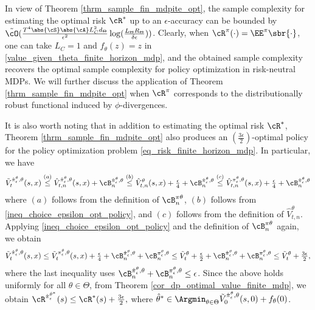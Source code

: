 \documentclass[9pt]{article}
\numberwithin{equation}{section}
\renewcommand{\frac}[2]{\tfrac{#1}{#2}}
\begin{document}
In view of Theorem \ref{thrm_sample_fin_mdpite_opt}, the sample complexity for estimating the optimal risk $\cR^*$ up to an $\epsilon$-accuracy can be bounded by $\tilde{\cO}({\frac{T^4 \abs{\cS} \abs{\cA} L_C^2 d_\Theta}{\epsilon^2} \log(\tfrac{L_\Theta R_\Theta}{\delta \epsilon}) } )$.
Clearly, when $\cR^\pi(\cdot) = \EE^\pi \sbr{\cdot}$, one can take $L_C = 1$ and $f_\theta(z) = z$ in \eqref{value_given_theta_finite_horizon_mdp}, and the obtained sample complexity recovers the optimal sample complexity for policy optimization in risk-neutral MDPs. 
We will further discuss the application of 
Theorem \ref{thrm_sample_fin_mdpite_opt} when $\cR^\pi$ corresponds to the distributionally robust functional induced by $\phi$-divergences. 


\begin{remark}
    It is also worth noting that in addition to estimating the optimal risk $\cR^*$,  Theorem \ref{thrm_sample_fin_mdpite_opt} also produces an $(\frac{3\epsilon}{2})$-optimal policy for the policy optimization problem \eqref{eq_risk_finite_horizon_mdp}.
In particular, we have 
\begin{align*}
   \tilde{V}_t^{\hat{\pi}_\epsilon^\theta, \theta}(s,x)      \overset{(a)}{\leq} \hat{V}_{t,n}^{\hat{\pi}_\epsilon^\theta, \theta}(s,x) +  \cB^{\hat{\pi}_\epsilon^\theta,\theta}_n   \overset{(b)}{\leq} \hat{V}_{t,n}^{\theta}(s,x) + \frac{\epsilon}{4} + \cB^{\hat{\pi}_\epsilon^\theta,\theta}_n  \overset{(c)}{\leq} \hat{V}_{t,n}^{\pi_\epsilon^\theta, \theta}(s,x) + \frac{\epsilon}{4} + \cB^{\hat{\pi}_\epsilon^\theta,\theta}_n 
\end{align*}
where $(a)$ follows from the definition of $\cB^{\pi \theta}_n$, 
$(b)$ follows from \eqref{ineq_choice_epsilon_opt_policy},
and $(c)$ follows from the definition of $\hat{V}^\theta_{t,n}$. 
Applying \eqref{ineq_choice_epsilon_opt_policy} and  the definition of $\cB^{\pi \theta}_n$ again, we obtain 
\begin{align*}
      \tilde{V}_t^{\hat{\pi}_\epsilon^\theta, \theta}(s,x) 
       \leq \tilde{V}_{t}^{\pi_\epsilon^\theta, \theta}(s,x) + \frac{\epsilon}{4} + \cB^{\hat{\pi}_\epsilon^\theta,\theta}_n + \cB^{\pi_\epsilon^\theta,\theta}_n
      \leq \tilde{V}^\theta_t + \frac{\epsilon}{2} + \cB^{\hat{\pi}_\epsilon^\theta,\theta}_n + \cB^{\pi_\epsilon^\theta,\theta}_n
  \leq \tilde{V}^\theta_t + \frac{3 \epsilon}{2},
\end{align*}
where the last inequality uses $\cB^{\hat{\pi}_\epsilon^\theta ,\theta}_n + \cB^{\pi_\epsilon^\theta ,\theta}_n\leq \epsilon$.
Since the above holds
uniformly for all $\theta \in \Theta$,
from Theorem \ref{cor_dp_optimal_value_finite_mdp}, 
we obtain   
$
\cR^{\hat{\pi}_\epsilon^{\hat{\theta}^*}} (s) \leq \cR^* (s) + \frac{3\epsilon}{2},
$
where 
$\hat{\theta}^* \in \Argmin_{\theta \in \Theta} \tilde{V}_0^{\hat{\pi}_\epsilon^\theta, \theta}(s,0) + f_\theta(0)$.
\end{remark}
\end{document}
